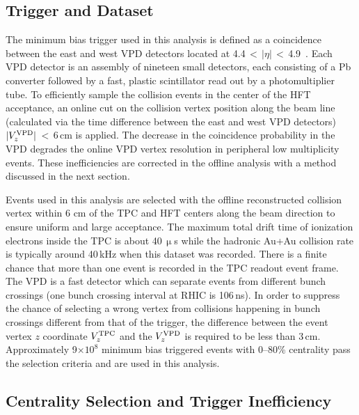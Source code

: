\documentclass[%
 reprint,	
 amsmath,amssymb,
 aps,
 prc,
]{revtex4-1}
\begin{document}
\subsection{Trigger and Dataset}
\label{dataset:trigger}

The minimum bias trigger used in this analysis is defined as a coincidence between the east and west VPD detectors located at 4.4\,$<$\,$|\eta|$\,$<$\,4.9~\cite{VPD}. Each VPD detector is an assembly of nineteen small detectors, each consisting of a Pb converter followed by a fast, plastic scintillator read out by a photomultiplier tube. To efficiently sample the collision events in the center of the HFT acceptance, an online cut on the collision vertex position along the beam line (calculated via the time difference between the east and west VPD detectors) $|V_z^{\rm VPD}|$\,$<$\,6\,cm is applied. 
The decrease in the coincidence probability in the VPD degrades the online VPD vertex resolution in peripheral low multiplicity events. These inefficiencies are corrected in the offline analysis with a method discussed in the next section. 

Events used in this analysis are selected with the offline reconstructed collision vertex within 6 cm of the TPC and HFT centers along the beam direction to ensure uniform and large acceptance. The maximum total drift time of ionization electrons inside the TPC is about 40\,$\upmu$s while the hadronic Au+Au collision rate is typically around 40\,kHz when this dataset was recorded. There is a finite chance that more than one event is recorded in the TPC readout event frame. The VPD is a fast detector which can separate events from different bunch crossings (one bunch crossing interval at RHIC is 106\,ns). In order to suppress the chance of selecting a wrong vertex from collisions happening in bunch crossings different from that of the trigger, the difference between the event vertex $z$ coordinate $V_{z}^{\rm TPC}$ and the $V_{z}^{\rm VPD}$ is required to be less than 3\,cm. Approximately 9$\times 10^{8}$ minimum bias triggered events with 0--80\% centrality pass the selection criteria and are used in this analysis.

\subsection{Centrality Selection and Trigger Inefficiency}
\label{dataset:Centrality}
\end{document}
